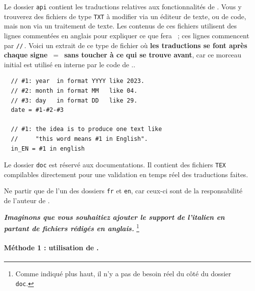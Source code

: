 \begin{tdocimp}
    Le dossier \verb#api# contient les traductions relatives aux fonctionnalités de \thisproj.
    Vous y trouverez des fichiers de type \verb#TXT# à modifier via un éditeur de texte, ou de code, mais non via un traitement de texte.
    Les contenus de ces fichiers utilisent des lignes commentées en anglais pour expliquer ce que fera \thisproj\ ; ces lignes commencent par \verb#//#\,. Voici un extrait de ce type de fichier où \textbf{les traductions se font après chaque signe \,$=$\, sans toucher à ce qui se trouve avant}, car ce morceau initial est utilisé en interne par le code de \thisproj..

    \tdocsep
    \vspace{-10pt}
    \begin{verbatim}
  // #1: year  in format YYYY like 2023.
  // #2: month in format MM   like 04.
  // #3: day   in format DD   like 29.
  date = #1-#2-#3

  // #1: the idea is to produce one text like
  //     "this word means #1 in English".
  in_EN = #1 in english\end{verbatim}
\end{tdocimp}


\begin{tdocnote}
    Le dossier \verb#doc# est réservé aux documentations. Il contient des fichiers \verb#TEX# compilables directement pour une validation en temps réel des traductions faites.
\end{tdocnote}


\begin{tdocwarn}
    Ne partir que de l'un des dossiers \verb#fr# et \verb#en#, car ceux-ci sont de la responsabilité de l'auteur de \thisproj.
\end{tdocwarn}


\medskip


\emph{\textbf{Imaginons que vous souhaitiez ajouter le support de l'italien en partant de fichiers rédigés en anglais.}}%
\footnote{
    Comme indiqué plus haut, il n'y a pas de besoin réel du côté du dossier \texttt{doc}.
}


\paragraph{Méthode 1 : utilisation de \git.}

